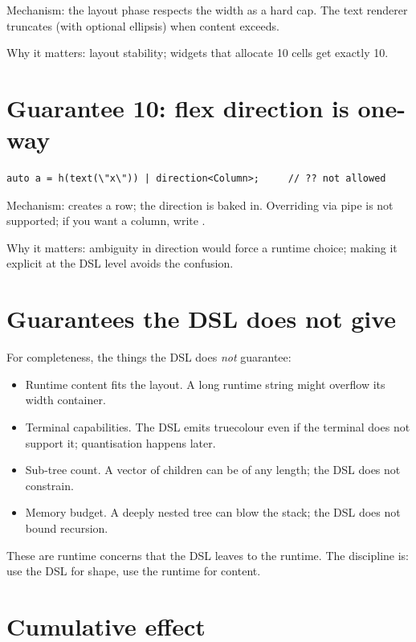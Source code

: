 Mechanism: the layout phase respects the width as a hard cap.
The text renderer truncates (with optional ellipsis) when
content exceeds.

Why it matters: layout stability; widgets that allocate 10
cells get exactly 10.

\section{Guarantee 10: flex direction is one-way}

\begin{lstlisting}
auto a = h(text(\"x\")) | direction<Column>;     // ?? not allowed
\end{lstlisting}

Mechanism:  creates a row; the direction is
baked in. Overriding via pipe is not supported; if you want a
column, write .

Why it matters: ambiguity in direction would force a runtime
choice; making it explicit at the DSL level avoids the
confusion.

\section{Guarantees the DSL does not give}

For completeness, the things the DSL does \emph{not} guarantee:

\begin{itemize}[leftmargin=*]
  \item Runtime content fits the layout. A long runtime string
    might overflow its width container.
  \item Terminal capabilities. The DSL emits truecolour even
    if the terminal does not support it; quantisation happens
    later.
  \item Sub-tree count. A vector of children can be of any
    length; the DSL does not constrain.
  \item Memory budget. A deeply nested tree can blow the
    stack; the DSL does not bound recursion.
\end{itemize}

These are runtime concerns that the DSL leaves to the
runtime. The discipline is: use the DSL for shape, use the
runtime for content.

\section{Cumulative effect}

